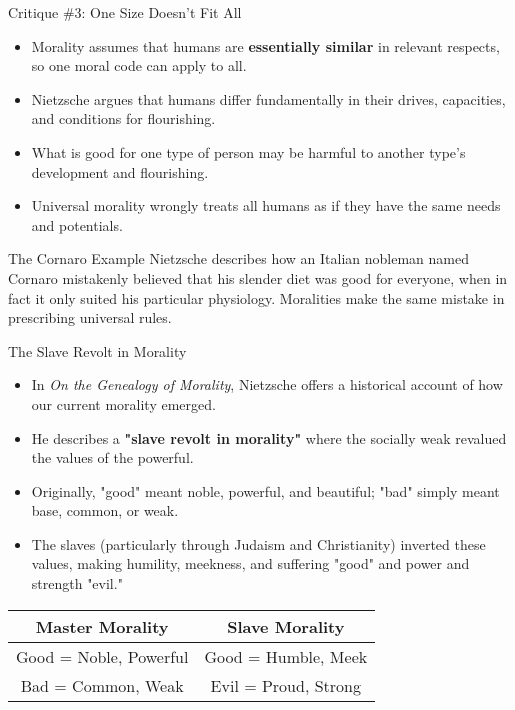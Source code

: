 \documentclass{beamer}
\begin{document}
\begin{frame}{Critique \#3: One Size Doesn't Fit All}
\begin{itemize}
\item Morality assumes that humans are \textbf{essentially similar} in relevant respects, so one moral code can apply to all.
\item Nietzsche argues that humans differ fundamentally in their drives, capacities, and conditions for flourishing.
\item What is good for one type of person may be harmful to another type's development and flourishing.
\item Universal morality wrongly treats all humans as if they have the same needs and potentials.
\end{itemize}

\begin{exampleblock}{The Cornaro Example}
Nietzsche describes how an Italian nobleman named Cornaro mistakenly believed that his slender diet was good for everyone, when in fact it only suited his particular physiology. Moralities make the same mistake in prescribing universal rules.
\end{exampleblock}
\end{frame}

\begin{frame}{The Slave Revolt in Morality}
\begin{itemize}
\item In \textit{On the Genealogy of Morality}, Nietzsche offers a historical account of how our current morality emerged.
\item He describes a \textbf{"slave revolt in morality"} where the socially weak revalued the values of the powerful.
\item Originally, "good" meant noble, powerful, and beautiful; "bad" simply meant base, common, or weak.
\item The slaves (particularly through Judaism and Christianity) inverted these values, making humility, meekness, and suffering "good" and power and strength "evil."
\end{itemize}

\begin{center}
\begin{tabular}{|c|c|}
\hline
\textbf{Master Morality} & \textbf{Slave Morality} \\
\hline
Good = Noble, Powerful & Good = Humble, Meek \\
Bad = Common, Weak & Evil = Proud, Strong \\
\hline
\end{tabular}
\end{center}
\end{frame}
\end{document}
